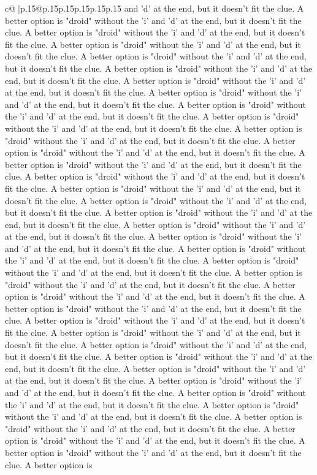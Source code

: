 \documentclass{article}
\begin{document}
{\begin{supertabular}{c@{$\;$}|p{.15\linewidth}@{}p{.15\linewidth}p{.15\linewidth}p{.15\linewidth}p{.15\linewidth}p{.15\linewidth}}
{{{and 'd' at the end, but it doesn't fit the clue. A better option is "droid" without the 'i' and 'd' at the end, but it doesn't fit the clue. A better option is "droid" without the 'i' and 'd' at the end, but it doesn't fit the clue. A better option is "droid" without the 'i' and 'd' at the end, but it doesn't fit the clue. A better option is "droid" without the 'i' and 'd' at the end, but it doesn't fit the clue. A better option is "droid" without the 'i' and 'd' at the end, but it doesn't fit the clue. A better option is "droid" without the 'i' and 'd' at the end, but it doesn't fit the clue. A better option is "droid" without the 'i' and 'd' at the end, but it doesn't fit the clue. A better option is "droid" without the 'i' and 'd' at the end, but it doesn't fit the clue. A better option is "droid" without the 'i' and 'd' at the end, but it doesn't fit the clue. A better option is "droid" without the 'i' and 'd' at the end, but it doesn't fit the clue. A better option is "droid" without the 'i' and 'd' at the end, but it doesn't fit the clue. A better option is "droid" without the 'i' and 'd' at the end, but it doesn't fit the clue. A better option is "droid" without the 'i' and 'd' at the end, but it doesn't fit the clue. A better option is "droid" without the 'i' and 'd' at the end, but it doesn't fit the clue. A better option is "droid" without the 'i' and 'd' at the end, but it doesn't fit the clue. A better option is "droid" without the 'i' and 'd' at the end, but it doesn't fit the clue. A better option is "droid" without the 'i' and 'd' at the end, but it doesn't fit the clue. A better option is "droid" without the 'i' and 'd' at the end, but it doesn't fit the clue. A better option is "droid" without the 'i' and 'd' at the end, but it doesn't fit the clue. A better option is "droid" without the 'i' and 'd' at the end, but it doesn't fit the clue. A better option is "droid" without the 'i' and 'd' at the end, but it doesn't fit the clue. A better option is "droid" without the 'i' and 'd' at the end, but it doesn't fit the clue. A better option is "droid" without the 'i' and 'd' at the end, but it doesn't fit the clue. A better option is "droid" without the 'i' and 'd' at the end, but it doesn't fit the clue. A better option is "droid" without the 'i' and 'd' at the end, but it doesn't fit the clue. A better option is "droid" without the 'i' and 'd' at the end, but it doesn't fit the clue. A better option is "droid" without the 'i' and 'd' at the end, but it doesn't fit the clue. A better option is "droid" without the 'i' and 'd' at the end, but it doesn't fit the clue. A better option is "droid" without the 'i' and 'd' at the end, but it doesn't fit the clue. A better option is "droid" without the 'i' and 'd' at the end, but it doesn't fit the clue. A better option is "droid" without the 'i' and 'd' at the end, but it doesn't fit the clue. A better option is "droid" without the 'i' and 'd' at the end, but it doesn't fit the clue. A better option is "droid" without the 'i' and 'd' at the end, but it doesn't fit the clue. A better option is "droid" without the 'i' and 'd' at the end, but it doesn't fit the clue. A better option is }}}
\end{supertabular}}
\end{document}
